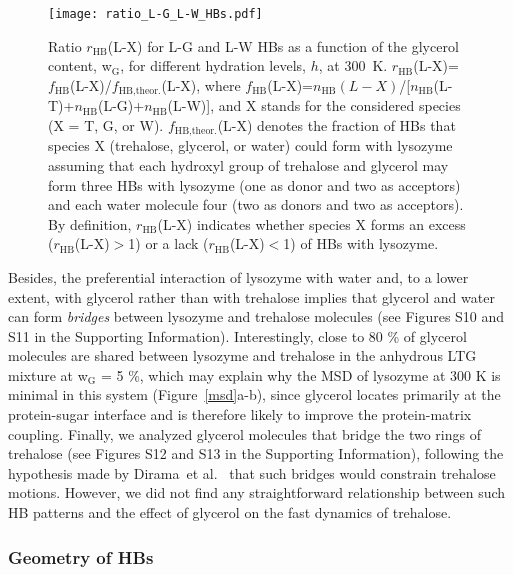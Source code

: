 \documentclass[journal=jpcbfk,manuscript=article]{achemso}
\begin{document}
\begin{singlespacing}
\begin{figure}[htbp]
\texttt{[image: ratio\_L-G\_L-W\_HBs.pdf]}
\caption{\label{pref_int}
Ratio $r_{\textrm{HB}}$(L-X) for L-G and L-W HBs as a function of the glycerol content, w$_{\textrm{G}}$, for different 
hydration levels, $h$, at 300~K. $r_{\textrm{HB}}$(L-X)=$f_{\textrm{HB}}$(L-X)/$f_{\textrm{HB,theor.}}$(L-X), where 
$f_{\textrm{HB}}$(L-X)=$n_{\textrm{HB}}(L-X)$/[$n_{\textrm{HB}}$(L-T)+$n_{\textrm{HB}}$(L-G)+$n_{\textrm{HB}}$(L-W)],
and X stands for the considered species (X = T, G, or W). 
$f_{\textrm{HB,theor.}}$(L-X) denotes the fraction of HBs that species X (trehalose, glycerol, or water) 
could form with lysozyme assuming that each hydroxyl group of trehalose and glycerol may form three HBs with lysozyme 
(one as donor and two as acceptors) and each water molecule four (two as donors and two as acceptors). 
By definition, $r_{\textrm{HB}}$(L-X) indicates whether species X forms an excess 
($r_{\textrm{HB}}$(L-X)$>$1) or a lack ($r_{\textrm{HB}}$(L-X)$<$1) of HBs with lysozyme. 
}
\end{figure}


\newpage 

Besides, the preferential interaction of lysozyme with water and, to a lower extent, with glycerol rather than with trehalose 
implies that glycerol and water can form \textit{bridges} between lysozyme and trehalose molecules (see Figures S10 and S11 in the 
Supporting Information). Interestingly, close to 80 \% of glycerol molecules are shared between lysozyme and trehalose 
in the anhydrous LTG mixture at w$_{\textrm{G}}$ = 5 \%, which may explain why the MSD of lysozyme at 300 K is minimal in this
system (Figure~\ref{msd}a-b), 
since glycerol locates primarily at the protein-sugar interface and is therefore likely to improve the protein-matrix coupling. 
Finally, we analyzed glycerol molecules that bridge the two rings of trehalose (see Figures S12 and S13 in the Supporting Information), 
following the hypothesis made by Dirama~et al.~\cite{Dirama2005} that such bridges would constrain trehalose motions.
However, we did not find any straightforward relationship between such HB patterns and the effect of glycerol on the fast dynamics 
of trehalose.


\subsubsection{Geometry of HBs}


\end{singlespacing}
\end{document}
